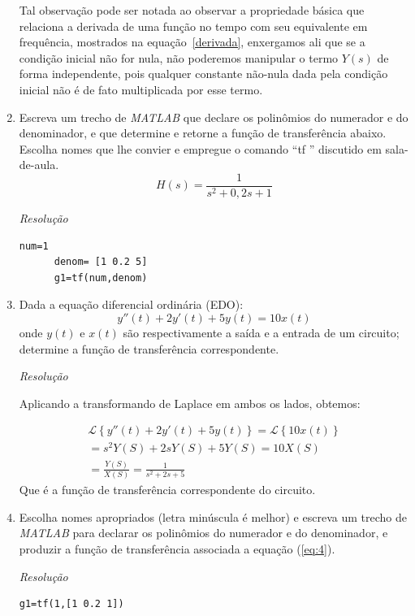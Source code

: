 \documentclass[12pt,a4paper]{article}
\begin{document}
\begin{enumerate}
  Tal observação pode ser notada ao observar a propriedade básica que relaciona a 
  derivada de uma função no tempo com seu equivalente em frequência, mostrados 
  na equação~\ref{derivada}, enxergamos ali que se a condição inicial não for 
  nula, não poderemos manipular o termo $Y(s)$ de forma independente, pois qualquer 
  constante não-nula dada pela condição inicial não é de fato 
  multiplicada por esse termo.
\item Escreva um trecho de \emph{MATLAB} que declare os polinômios do numerador e do 
  denominador, e que determine e retorne a função de transferência abaixo.\\
  Escolha nomes que lhe convier e empregue o comando ``tf ” discutido em 
  sala-de-aula.
  \begin{equation}
    \label{eq:4}
    H(s)=\frac{1}{s^2 +0,2 s + 1}
  \end{equation}

  \emph{Resolução}
     \begin{lstlisting}[label=matlab:1, caption=Código em MATLAB para a função de transferência $g_1(s)$ associada a equação~\ref{eq:4}]
      num=1 
      denom= [1 0.2 5]
      g1=tf(num,denom)
    \end{lstlisting}

\item Dada a equação diferencial ordinária (EDO): 
  \begin{equation}
    \label{eq:5}
    y''(t)+2y'(t)+5y(t)= 10x(t)
  \end{equation}
  onde $y(t)$ e $x(t)$ são respectivamente a saída e a entrada de um circuito; 
  determine a função de transferência correspondente. 
  
  \emph{Resolução}

  Aplicando a transformando de Laplace em ambos os lados, obtemos:

\begin{align}
  \mathcal{L}\left\{y''(t)+2y'(t)+5y(t)\right\}=\mathcal{L}\left\{10x(t)\right\}\\
  =s^2Y(S)+2sY(S)+5Y(S)=10 X(S)\\
  =\frac{Y(S)}{X(S)}=\frac{1}{s^2+2s+5}
  \end{align}
  Que é a função de transferência correspondente do circuito.
\item Escolha nomes apropriados (letra minúscula é melhor) e escreva um trecho de 
  \emph{MATLAB} para declarar os polinômios do numerador e do denominador, e produzir 
  a função de transferência associada a equação (\ref{eq:4}).

  \emph{Resolução}

     \begin{lstlisting}[label=matlab:2, caption=Código em MATLAB para a função de transferência $g_1(s)$ associada a equação~\ref{eq:4}]
      g1=tf(1,[1 0.2 1]) 
    \end{lstlisting}
 
\end{enumerate}
\end{document}
